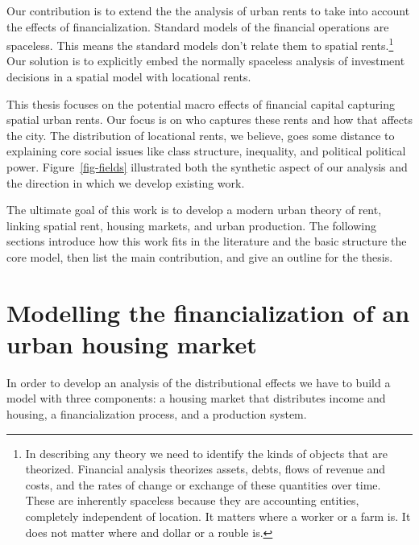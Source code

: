 Our contribution is to extend the the analysis of urban rents to take into account the effects of financialization. 
Standard models of the financial operations are spaceless. This means the standard models don't relate them to spatial rents.\footnote{In describing any theory we need to identify the kinds of objects that are theorized. Financial analysis theorizes  assets, debts, flows of revenue and costs, and the rates of change or exchange of these quantities over time. These are inherently spaceless because they are accounting entities, completely independent of location. It matters where a worker or a farm is. It does not matter where and dollar or a rouble is.} 
Our solution is to explicitly embed the normally spaceless analysis of investment decisions in a spatial model with locational rents. %

This thesis focuses on the potential macro effects of financial capital capturing spatial urban rents.  %
Our focus is on who captures these rents and how that affects the city. The distribution of locational rents, we believe, goes some distance to explaining core social issues like class structure, inequality, and political political power.  Figure~\ref{fig-fields} illustrated both the synthetic aspect of our analysis and the direction in which we develop existing work. %

The ultimate goal of this work is to develop a modern urban theory of rent, linking spatial rent, housing markets, and urban production. The following sections introduce how this work fits in the literature and the basic structure the core model, then list the main contribution, and give an outline for the thesis.


\section{Modelling the financialization of an urban housing market}
In order to develop an analysis of the distributional effects we have to build a model with three components: a housing market that distributes income and housing, a financialization process, and a production system. 

